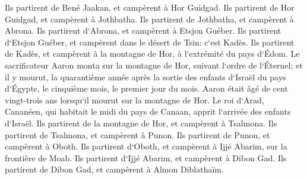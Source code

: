 \verse Ils partirent de Bené Jaakan, et campèrent à Hor Guidgad. 
\verse Ils partirent de Hor Guidgad, et campèrent à Jothbatha. 
\verse Ils partirent de Jothbatha, et campèrent à Abrona. 
\verse Ils partirent d`Abrona, et campèrent à Etsjon Guéber. 
\verse Ils partirent d`Etsjon Guéber, et campèrent dans le désert de Tsin: c`est Kadès. 
\verse Ils partirent de Kadès, et campèrent à la montagne de Hor, à l`extrémité du pays d`Édom. 
\verse Le sacrificateur Aaron monta sur la montagne de Hor, suivant l`ordre de l`Éternel; et il y mourut, la quarantième année après la sortie des enfants d`Israël du pays d`Égypte, le cinquième mois, le premier jour du mois. 
\verse Aaron était âgé de cent vingt-trois ans lorsqu`il mourut sur la montagne de Hor. 
\verse Le roi d`Arad, Cananéen, qui habitait le midi du pays de Canaan, apprit l`arrivée des enfants d`Israël. 
\verse Ils partirent de la montagne de Hor, et campèrent à Tsalmona. 
\verse Ils partirent de Tsalmona, et campèrent à Punon. 
\verse Ils partirent de Punon, et campèrent à Oboth. 
\verse Ils partirent d`Oboth, et campèrent à Ijjé Abarim, sur la frontière de Moab. 
\verse Ils partirent d`Ijjé Abarim, et campèrent à Dibon Gad. 
\verse Ils partirent de Dibon Gad, et campèrent à Almon Diblathaïm. 
